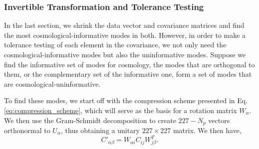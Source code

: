 \documentclass[twocolumn]{\docclass}
\newcommand\be{\begin{equation}}
\newcommand\ee{\end{equation}}
\begin{document}
	
	\subsubsection{Invertible Transformation and Tolerance Testing}
	
	In the last section, we shrink the data vector and covariance matrices and find the most cosmological-informative modes in both. However, in order to make a tolerance testing of each element in the covariance, we not only need the cosmological-informative modes but also the uninformative modes. Suppose we find the informative set of modes for cosmology, the modes that are orthogonal to them, or the complementary set of the informative one, form a set of modes that are cosmological-uninformative. 
	
	To find these modes, we start off with the compression scheme presented in Eq. \ref{eq:compression_scheme}, which will serve as the basis for a rotation matrix $W_\alpha$. We then use the Gram-Schmidt decomposition to create $227 - N_p$ vectors orthonormal to $U_{\alpha}$, thus obtaining a unitary $227 \times 227$ matrix. We then have,
	\be
	C'_{\alpha\beta} = W_{\alpha i} C_{ij} W^T_{j\beta}.
	\ee
	
\end{document}
